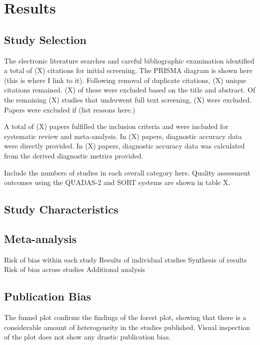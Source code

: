 \section{Results}

\subsection{Study Selection}

The electronic literature searches and careful bibliographic examination identified a total of (X) citations for initial screening.
The PRISMA diagram is shown here (this is where I link to it).
Following removal of duplicate citations, (X) unique citations remained.
(X) of these were excluded based on the title and abstract.
Of the remaining (X) studies that underwent full text screening, (X) were excluded.
Papers were excluded if (list reasons here.)

A total of (X) papers fulfilled the inclusion criteria and were included for systematic review and meta-analysis.
In (X) papers, diagnostic accuracy data were directly provided. 
In (X) papers, diagnostic accuracy data was calculated from the derived diagnostic metrics provided.

Include the numbers of studies in each overall category here.
Quality assessment outcomes using the QUADAS-2 and SORT systems are shown in table X.




\subsection{Study Characteristics}

\subsection{Meta-analysis}

Risk of bias within each study
Results of individual studies
Synthesis of results
Risk of bias across studies
Additional analysis

\subsection{Publication Bias}

The funnel plot confirms the findings of the forest plot, showing that there is a considerable amount of heterogeneity in the studies published.
Visual inspection of the plot does not show any drastic publication bias.

